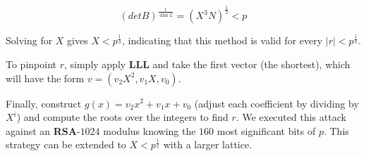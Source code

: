 \documentclass[a4paper,12pt]{report}
\begin{document}
\[
    (detB)^{\frac{1}{\dim L}} = (X^3N)^{\frac{1}{3}} < p
\]

Solving for $X$ gives $X < p^{\frac{1}{3}}$, indicating that this method is valid for every $|r| < p^{\frac{1}{3}}$.

To pinpoint $r$, simply apply \textbf{LLL} and take the first vector (the shortest), which will have the form $v = (v_2X^2, v_1X, v_0)$.

Finally, construct $g(x) = v_2x^2 + v_1x + v_0$ (adjust each coefficient by dividing by $X^i$) and compute the roots over the integers to find $r$. We executed this attack against an \textbf{RSA}-$1024$ modulus knowing the $160$ most significant bits of $p$. This strategy can be extended to $X < p^{\frac{1}{2}}$ with a larger lattice.

% 
% 
% 
% 
% 
% 
% 
% 
% 
% 
% 
\end{document}
